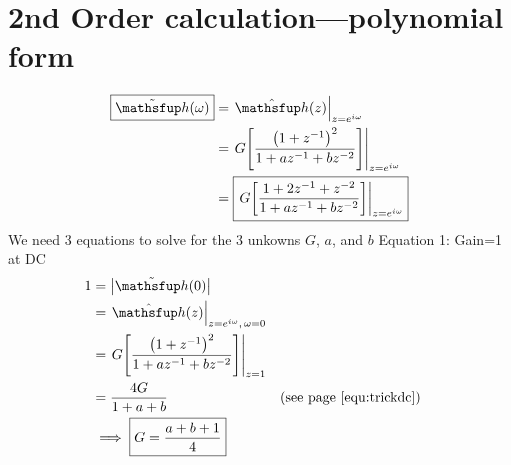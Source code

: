 \section{2nd Order  calculation---polynomial form}
\mbox{}\vfill
\begin{align*}
  \boxed{\Fh(\omega)}
    &= \brlr{\Zh(z)}_{z=e^{i\omega}}
  \\&= \brlr{G\brs{\frac{\brp{1+z^{-1}}^2}
                        {1 + az^{-1} + bz^{-2}}}}_{z=e^{i\omega}}
  \\&= \boxed{\brlr{
         G\brs{\frac{1 + 2z^{-1} +  z^{-2}}
                    {1 + az^{-1} + bz^{-2}}
              }
                   }_{z=e^{i\omega}}
             }
\end{align*}
\vfill
We need 3 equations to solve for the 3 unkowns $G$, $a$, and $b$
\vfill\mbox{}
\newpage
Equation 1: Gain=1 at DC
\vfill
\begin{align*}
  1 &= \abs{\Fh(0)}
  \\&= \brlr{\Zh(z)}_{z=e^{i\omega},\,\omega=0}
  \\&= \brlr{G\brs{\frac{\brp{1+z^{-1}}^2}
                      {1 + az^{-1} + bz^{-2}}}}_{z=1}
  \\&= \frac{4G}{1 + a + b}
    && \text{(see \prefpo{equ:trickdc})}
  \\&\implies \boxed{G = \frac{a + b + 1}{4}}
\end{align*}
\vfill\mbox{}

